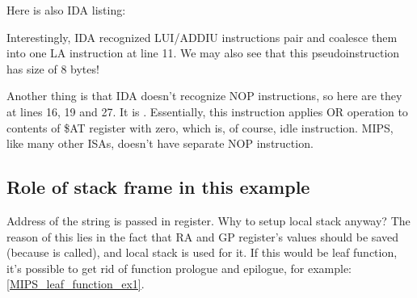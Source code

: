 Here is also IDA listing:



Interestingly, IDA recognized LUI/ADDIU instructions pair and coalesce them into one LA instruction at line 11.
We may also see that this pseudoinstruction has size of 8 bytes!

Another thing is that IDA doesn't recognize \ac{NOP} instructions, so here are they at lines 16, 19 and 27.
It is . Essentially, this instruction applies OR operation to contents of \$AT register
with zero, which is, of course, idle instruction. 
MIPS, like many other \ac{ISA}s, doesn't have separate \ac{NOP} instruction.

\subsection{Role of stack frame in this example}

Address of the string is passed in register. 
Why to setup local stack anyway?
The reason of this lies in the fact that \ac{RA} and GP register's values should be saved (because \printf
is called), and local stack is used for it.
If this would be \gls{leaf function}, it's possible to get rid of function prologue and epilogue,
for example: \ref{MIPS_leaf_function_ex1}.

\fi
